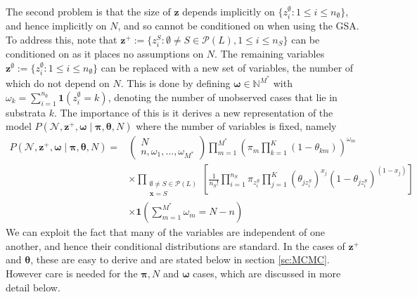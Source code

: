 \documentclass[10pt,a4paper,notitlepage]{article}
\newcommand{\N}{\mathbb{N}}
\newcommand{\x}{\textbf{x}}
\begin{document}
The second problem is that the size of $\mathbf{z}$ depends implicitly on $\{z^{\emptyset}_{i} : 1\leq i\leq n_{\emptyset}\}$, and hence implicitly on $N$, and so cannot be conditioned on when using the GSA. To address this, note that $\mathbf{z}^{+} := \{z^{S}_{i}:\emptyset\neq S\in\mathcal{P}(L), 1\leq i\leq n_{S}\}$ can be conditioned on as it places no assumptions on $N$. The remaining variables $\mathbf{z}^{\emptyset}:=\{z^{\emptyset}_{i}:1\leq i\leq n_{\emptyset}\}$ can be replaced with a new set of variables, the number of which do not depend on $N$. This is done by defining $\bm{\omega}\in \N^{M^{*}}$ with $\omega_{k}=\sum_{i=1}^{n_\emptyset}\mathbf{1}(z_{i}^{\emptyset}=k)$, denoting the number of unobserved cases that lie in substrata $k$. The importance of this is it derives a new representation of the model $P(\mathcal{N},\mathbf{z}^{+},\bm{\omega}\mid \bm{\pi},\bm{\theta},N)$ where the number of variables is fixed, namely 
\begin{equation}\label{eq:FINALFINAL}
\begin{aligned}
P(\mathcal{N},\mathbf{z}^{+},\bm{\omega}\mid\bm{\pi},\bm{\theta},N) = &\begin{pmatrix} N\\ n, \omega_{1},\hdots,\omega_{M^{*}}  \end{pmatrix} \prod_{m=1}^{M^{*}}\left(\pi_{m}\prod_{k=1}^{K}(1-\theta_{km})\right)^{\omega_{m}}\\
&\times \prod_{\substack{\emptyset\neq S\in\mathcal{P}(L)\\ \x=S}}\left[\frac{1}{n_{S}!}\prod_{i=1}^{n_{S}}\pi_{z^{S}_{i}}\prod_{j=1}^{K}(\theta_{jz^{S}_{i}})^{x_{j}}(1-\theta_{jz^{S}_{i}})^{(1-x_{j})}\right]\\
&\times \mathbf{1}\left(\sum_{m=1}^{M^{*}}\omega_{m}=N-n\right)
\end{aligned}
\end{equation}
We can exploit the fact that many of the variables are independent of one another, and hence their conditional distributions are standard. In the cases of $\mathbf{z}^{+}$ and $\bm{\theta}$, these are easy to derive and are stated below in section \ref{sc:MCMC}.  However care is needed for the $\bm{\pi}, N$ and $\bm{\omega}$ cases, which are discussed in more detail below.
\end{document}
